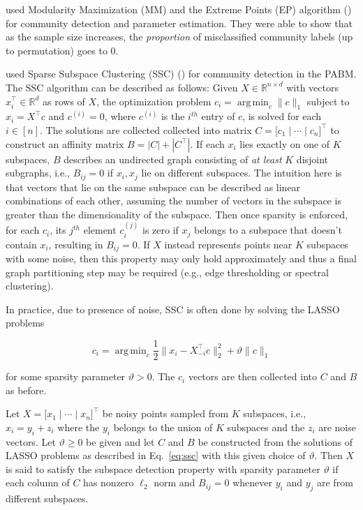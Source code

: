 \documentclass[12pt]{article}
\DeclareMathOperator*{\argmin}{arg\,min}
\begin{document}
\citet{307cbeb9b1be48299388437423d94bf1} 
used Modularity Maximization (MM) and the Extreme Points (EP)
algorithm (\cite{le2016}) for community detection and parameter
estimation. They were able to show that as the sample size increases,
the {\em proportion} of misclassified community labels (up to permutation)
goes to 0.

\citet{noroozi2019estimation} used Sparse Subspace Clustering (SSC) 
(\cite{5206547}) for community detection in the PABM. 
The SSC algorithm can be described as follows: 
Given \(X \in \mathbb{R}^{n \times d}\) with vectors
\(x_i^\top \in \mathbb{R}^d\) as rows of \(X\), the optimization problem
\(c_i = \argmin_{c} \|c\|_1\) subject to \(x_i = X^\top c\) and
\(c^{(i)} = 0\), where $c^{(i)}$ is the $i^{th}$ entry of $c$, is solved for each \(i \in [n]\). 
The solutions are collected collected into matrix
\(C = \bigl[ c_1 \mid \cdots \mid c_n \bigr]^\top\) to
construct an affinity matrix \(B = |C| + |C^\top|\). If each \(x_i\) lies
exactly on one of \(K\) subspaces, \(B\) describes an undirected graph
consisting of {\em at least} \(K\) disjoint subgraphs, i.e., \(B_{ij} = 0\) if \(x_i, x_j\) lie on different subspaces. 
The intuition here is that vectors that lie on the same subspace can be described as linear combinations of each other, assuming the number of vectors in the subspace is greater than the dimensionality of the subspace. 
Then once sparsity is enforced, for each $c_i$, its $j^{th}$ element $c_i^{(j)}$ is zero if $x_j$ belongs to a subspace that doesn't contain $x_i$, resulting in $B_{ij} = 0$. 
If \(X\) instead represents points near \(K\) subspaces with some noise, 
then this property may only hold approximately and thus a final graph partitioning step may be required 
(e.g., edge thresholding or spectral clustering).

In practice, due to presence of noise, SSC is often done by solving the LASSO problems

\begin{equation} \label{eq:ssc}
c_i = \argmin_c \frac{1}{2} \|x_i - X_{-i}^\top c\|^2_2 + \vartheta \|c\|_1
\end{equation}

for some sparsity parameter \(\vartheta > 0\). 
The \(c_i\) vectors are then collected into \(C\) and \(B\) as before.

\begin{definition}
  \label{def:subspace_detection}
Let $X = \bigl[ x_1 \mid \cdots \mid x_n \bigr]^\top$ be noisy
points sampled from $K$ subspaces, i.e., $x_i = y_i + z_i$ where the
$y_i$ belongs to the union of $K$ subspaces and the $z_i$ are noise
vectors. Let $\vartheta \geq 0$ be given and
let $C$ and $B$ be constructed from the
solutions of LASSO problems as described in Eq.~\eqref{eq:ssc} with
this given choice of $\vartheta$. Then $X$
is said to satisfy the subspace detection property 
with sparsity parameter $\vartheta$ if each column of
$C$ has nonzero $\ell_2$ norm and $B_{ij} = 0$ whenever $y_i$ and $y_j$ are
from different subspaces.
\end{definition}
\end{document}
